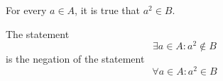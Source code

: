 \documentclass[main.tex]{subfiles}
\begin{document}
\subproblem{}\label{4a}
For every \(a \in A\), it is true that \(a^2 \in B\).

\begin{remark}
	The statement
	\[\exists a \in A: a^2 \notin B\]
	is the negation of the statement
	\[\forall a \in A: a^2 \in B\]
\end{remark}
\end{document}

